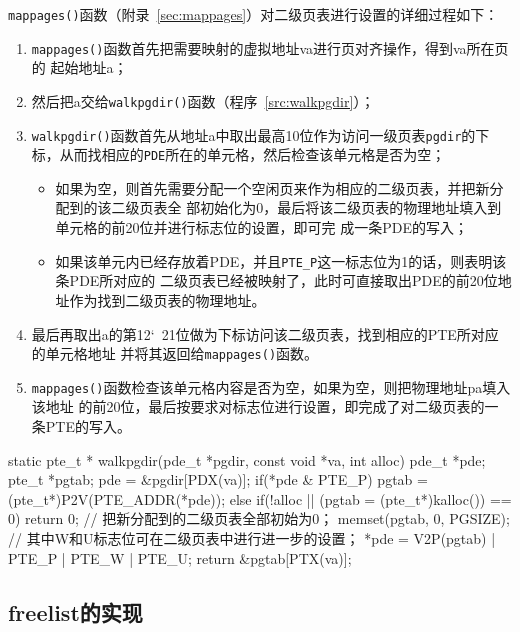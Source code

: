 \documentclass{swfcthesismscctex}
\begin{document}
\texttt{mappages()}函数（附录~\ref{sec:mappages}）对二级页表进行设置的详细过程如下：
\begin{enumerate}
\item \texttt{mappages()}函数首先把需要映射的虚拟地址va进行页对齐操作，得到va所在页的
  起始地址a；
\item 然后把a交给\texttt{walkpgdir()}函数（程序~\ref{src:walkpgdir}）；
\item \texttt{walkpgdir()}函数首先从地址a中取出最高10位作为访问一级页表\texttt{pgdir}的下
  标，从而找相应的\texttt{PDE}所在的单元格，然后检查该单元格是否为空；
  \begin{itemize}
  \item 如果为空，则首先需要分配一个空闲页来作为相应的二级页表，并把新分配到的该二级页表全
    部初始化为0，最后将该二级页表的物理地址填入到单元格的前20位并进行标志位的设置，即可完
    成一条PDE的写入；
  \item 如果该单元内已经存放着PDE，并且\verb|PTE_P|这一标志位为1的话，则表明该条PDE所对应的
    二级页表已经被映射了，此时可直接取出PDE的前20位地址作为找到二级页表的物理地址。
  \end{itemize}
\item 最后再取出a的第12\char`~21位做为下标访问该二级页表，找到相应的PTE所对应的单元格地址
  并将其返回给\texttt{mappages()}函数。
\item \texttt{mappages()}函数检查该单元格内容是否为空，如果为空，则把物理地址pa填入该地址
  的前20位，最后按要求对标志位进行设置，即完成了对二级页表的一条PTE的写入。
\end{enumerate}

\begin{listing}%
  \begin{codeblock}
\begin{ccode}
static pte_t *
walkpgdir(pde_t *pgdir, const void *va, int alloc)
{
  pde_t *pde;
  pte_t *pgtab;
  pde = &pgdir[PDX(va)];
  if(*pde & PTE_P){
    pgtab = (pte_t*)P2V(PTE_ADDR(*pde));
  }
  else {
    if(!alloc || (pgtab = (pte_t*)kalloc()) == 0)
      return 0;
    // 把新分配到的二级页表全部初始为0；
    memset(pgtab, 0, PGSIZE);
    // 其中W和U标志位可在二级页表中进行进一步的设置；
    *pde = V2P(pgtab) | PTE_P | PTE_W | PTE_U;
  }
  return &pgtab[PTX(va)];
}
\end{ccode}
  \end{codeblock}
  \label{src:walkpgdir}
\end{listing}

\subsection{freelist的实现}
\end{document}
